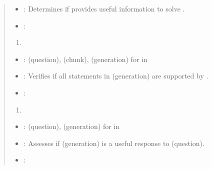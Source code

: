\documentclass[letterpaper,11pt,english]{sphinxmanual}
\begin{document}
\begin{quote}
\begin{itemize}
\item {} 
\sphinxAtStartPar
{}:
Determines if  provides useful information to solve .

\item {} 
\sphinxAtStartPar
{}:
\sphinxhyphen{} 
\sphinxhyphen{} 

\end{itemize}
\begin{enumerate}
%
\setcounter{enumi}{2}
\item {} 
\sphinxAtStartPar
{}

\end{enumerate}
\begin{itemize}
\item {} 
\sphinxAtStartPar
{}:
\sphinxhyphen{}  (question),  (chunk),  (generation) for  in 

\item {} 
\sphinxAtStartPar
{}:
Verifies if all statements in  (generation) are supported by .

\item {} 
\sphinxAtStartPar
{}:
\sphinxhyphen{} 
\sphinxhyphen{} 
\sphinxhyphen{} 

\end{itemize}
\begin{enumerate}
%
\setcounter{enumi}{3}
\item {} 
\sphinxAtStartPar
{}

\end{enumerate}
\begin{itemize}
\item {} 
\sphinxAtStartPar
{}:
\sphinxhyphen{}  (question),  (generation) for  in 

\item {} 
\sphinxAtStartPar
{}:
Assesses if  (generation) is a useful response to  (question).

\item {} 
\sphinxAtStartPar
{}:
\sphinxhyphen{} 

\end{itemize}
\end{quote}
\end{document}
